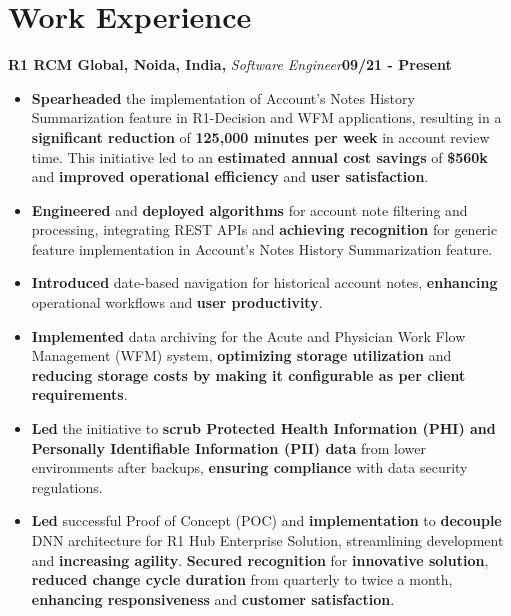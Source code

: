 \documentclass{article}
\newcommand{\subheading}[1]{\textbf{#1}}
\newenvironment{workexp}[3]{%
  \noindent\subheading{#1,} \textit{#2}\hfill\textbf{#3}\par%
}{\bigskip}
\begin{document}
\section*{Work Experience}
\begin{workexp}{R1 RCM Global, Noida, India}{Software Engineer}{09/21 - Present}
	\begin{itemize}[left=0pt, align=left]
		\item \textbf{Spearheaded} the implementation of Account’s Notes
		      History Summarization feature in R1-Decision and WFM
		      applications, resulting in a \textbf{significant reduction} of
		      \textbf{125,000 minutes per week} in account review time. This
		      initiative led to an \textbf{estimated annual cost savings} of
		      \textbf{\$560k} and \textbf{improved operational efficiency} and
		      \textbf{user satisfaction}.
		          
		\item \textbf{Engineered} and \textbf{deployed algorithms} for account
		      note filtering and processing, integrating REST APIs and
		      \textbf{achieving recognition} for generic feature
		      implementation in Account’s Notes History Summarization
		      feature.
		          
		\item \textbf{Introduced} date-based navigation for historical
		      account notes, \textbf{enhancing} operational workflows and
		      \textbf{user productivity}.
		          
		\item \textbf{Implemented} data archiving for the Acute and
		      Physician Work Flow Management (WFM) system,
		      \textbf{optimizing storage utilization} and
		      \textbf{reducing storage costs by making it configurable as per
		      client requirements}.
		          
		\item \textbf{Led} the initiative to \textbf{scrub Protected Health Information (PHI) and Personally
		Identifiable Information (PII) data}
		from lower environments after backups,
		\textbf{ensuring compliance} with data security regulations.
		    
		\item \textbf{Led} successful Proof of Concept (POC) and
		      \textbf{implementation} to \textbf{decouple} DNN architecture
		      for R1 Hub Enterprise Solution, streamlining development and
		      \textbf{increasing agility}. \textbf{Secured recognition} for
		      \textbf{innovative solution},
		      \textbf{reduced change cycle duration} from quarterly to twice
		      a month, \textbf{enhancing responsiveness} and
		      \textbf{customer satisfaction}.
		          

\end{itemize}
\end{workexp}
\end{document}
